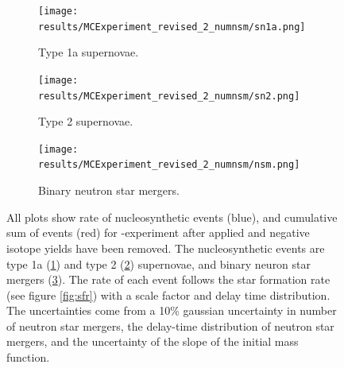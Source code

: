\begin{figure}[h]
  \centering
  \begin{subfigure}{\subfigwidth}
    \texttt{[image: results/MCExperiment\_revised\_2\_numnsm/sn1a.png]}
    \caption{ \label{fig:MCExperiment-numnsm-sn1a}
      Type 1a supernovae.
    }
  \end{subfigure}
  \begin{subfigure}{\subfigwidth}
    \texttt{[image: results/MCExperiment\_revised\_2\_numnsm/sn2.png]}
    \caption{ \label{fig:MCExperiment-numnsm-sn2}
      Type 2 supernovae.
    }
  \end{subfigure}
  \begin{subfigure}{\figwidth}
    \texttt{[image: results/MCExperiment\_revised\_2\_numnsm/nsm.png]}
    \caption{ \label{fig:MCExperiment-numnsm-nsm}
      Binary neutron star mergers.
    }
  \end{subfigure}
  \caption[Rate of nucleosynthetic events \expthree]{ \label{fig:MCExperiment-numnsm-rate}
    All plots show rate of nucleosynthetic events (blue), and cumulative sum of events (red) for \expthree-experiment
    after \betadecay applied and negative isotope yields have been removed.
    The nucleosynthetic events are type 1a (\ref{fig:MCExperiment-numnsm-sn1a}) and type 2 (\ref{fig:MCExperiment-numnsm-sn2})
    supernovae, and binary neuron star mergers (\ref{fig:MCExperiment-numnsm-nsm}).
    The rate of each event follows the star formation rate (see figure \ref{fig:sfr}) with a scale factor and delay time distribution.
    The uncertainties come from a 10\% gaussian uncertainty in number of neutron star mergers, the delay-time distribution of neutron star mergers, and the uncertainty of the slope of the initial mass function.
  } 
\end{figure}
\FloatBarrier %

